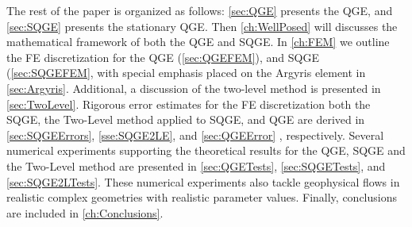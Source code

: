 The rest of the paper is organized as follows: \autoref{sec:QGE} presents the
QGE, and \autoref{sec:SQGE} presents the stationary QGE. Then
\autoref{ch:WellPosed} will discusses the mathematical framework of both the QGE
and SQGE.  In \autoref{ch:FEM} we outline the FE discretization for the QGE
(\autoref{sec:QGEFEM}), and SQGE (\autoref{sec:SQGEFEM}, with special emphasis
placed on the Argyris element in \autoref{sec:Argyris}. Additional, a discussion
of the two-level method is presented in \autoref{sec:TwoLevel}. Rigorous error
estimates for the FE discretization both the SQGE, the Two-Level method applied
to SQGE, and QGE are derived in \autoref{sec:SQGEErrors}, \autoref{sse:SQGE2LE},
and \autoref{sec:QGEError} , respectively.  Several numerical experiments
supporting the theoretical results for the QGE, SQGE and the Two-Level method
are presented in \autoref{sec:QGETests}, \autoref{sec:SQGETests}, and
\autoref{sec:SQGE2LTests}. These numerical experiments also tackle geophysical
flows in realistic complex geometries with realistic parameter values. Finally,
conclusions are included in \autoref{ch:Conclusions}.

